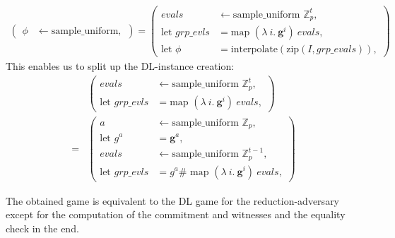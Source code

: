 \begin{equation*}
    \begin{aligned}
        \left(
        \begin{aligned}
            \phi & \leftarrow \text{sample\_uniform},
        \end{aligned}
        \right)
        = \left(
            \begin{aligned}
                evals &\leftarrow \text{sample\_uniform } \mathbb{Z}_p^t, \\
                \text{let } grp\_evls &= \text{map } (\lambda\ i. \ \mathbf{g}^i)\ evals,\\
                \text{let } \phi &= \text{interpolate}(\text{zip}(I,grp\_evals)),
            \end{aligned}
            \right)
    \end{aligned}
\end{equation*}
This enables us to split up the DL-instance creation:
\begin{equation*}
    \begin{aligned}
        &\left(
            \begin{aligned}
                evals &\leftarrow \text{sample\_uniform } \mathbb{Z}_p^t, \\
                \text{let } grp\_evls &= \text{map } (\lambda\ i. \ \mathbf{g}^i)\ evals,
            \end{aligned}
        \right)\\
        =&\left(
            \begin{aligned}
                a &\leftarrow \text{sample\_uniform } \mathbb{Z}_p,\\
                \text{let } g^a &= \mathbf{g}^a,\\
                evals &\leftarrow \text{sample\_uniform } \mathbb{Z}_p^{t-1}, \\
                \text{let } grp\_evls &= g^a\#\text{ map } (\lambda\ i. \ \mathbf{g}^i)\ evals,
            \end{aligned}
        \right)
    \end{aligned}
\end{equation*}

The obtained game is equivalent to the DL game for the reduction-adversary except for the computation of the commitment and witnesses and the equality check in the end. 

